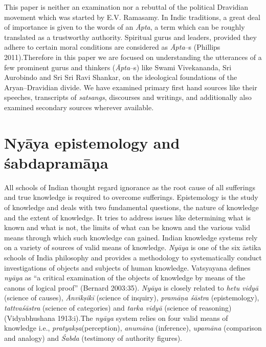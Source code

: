 This paper is neither an examination nor a rebuttal of the political Dravidian movement which was started by E.V. Ramasamy. In Indic traditions, a great deal of importance is given to the words of an \textit{Āpta}, a term which can be roughly translated as a trustworthy authority. Spiritual gurus and leaders, provided they adhere to certain moral conditions are considered as \textit{Āpta}–s (Phillips 2011).Therefore in this paper we are focused on understanding the utterances of a few prominent gurus and thinkers (\textit{Āpta}–s) like Swami Vivekananda, Sri Aurobindo and Sri Sri Ravi Shankar, on the ideological foundations of the Aryan–Dravidian divide. We have examined primary first hand sources like their speeches, transcripts of \textit{satsangs}, discourses and writings, and additionally also examined secondary sources wherever available.


\section*{Nyāya epistemology and śabdapramāṇa}

All schools of Indian thought regard ignorance as the root cause of all sufferings and true knowledge is required to overcome sufferings. Epistemology is the study of knowledge and deals with two fundamental questions, the nature of knowledge and the extent of knowledge. It tries to address issues like determining what is known and what is not, the limits of what can be known and the various valid means through which such knowledge can gained. Indian knowledge systems rely on a variety of sources of valid means of knowledge. \textit{Nyāya} is one of the six āstika schools of India philosophy and provides a methodology to systematically conduct investigations of objects and subjects of human knowledge. Vatsyayana defines \textit{nyāya} as “a critical examination of the objects of knowledge by means of the canons of logical proof” (Bernard 2003:35). \textit{Nyāya} is closely related to \textit{hetu vidyā} (science of causes), \textit{Ānvīkṣikī} (science of inquiry), \textit{pramāṇa śāstra} (epistemology), \textit{tattvaśāstra} (science of categories) and \textit{tarka vidyā} (science of reasoning) (Vidyabhushana 1913:i).The \textit{nyāya} system relies on four valid means of knowledge i.e., \textit{pratyakṣa}(perception), \textit{anumāna} (inference), \textit{upamāna} (comparison and analogy) and \textit{Śabda} (testimony of authority figures).

